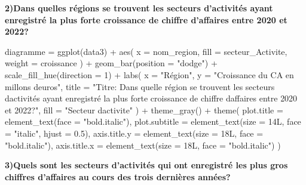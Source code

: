 \documentclass[mstat,12pt]{unswthesis}
\newenvironment{Shaded}{\begin{snugshade}}{\end{snugshade}}
\newcommand{\AttributeTok}[1]{\textcolor[rgb]{0.77,0.63,0.00}{#1}}
\newcommand{\DecValTok}[1]{\textcolor[rgb]{0.00,0.00,0.81}{#1}}
\newcommand{\FloatTok}[1]{\textcolor[rgb]{0.00,0.00,0.81}{#1}}
\newcommand{\FunctionTok}[1]{\textcolor[rgb]{0.00,0.00,0.00}{#1}}
\newcommand{\NormalTok}[1]{#1}
\newcommand{\OtherTok}[1]{\textcolor[rgb]{0.56,0.35,0.01}{#1}}
\newcommand{\SpecialCharTok}[1]{\textcolor[rgb]{0.00,0.00,0.00}{#1}}
\newcommand{\StringTok}[1]{\textcolor[rgb]{0.31,0.60,0.02}{#1}}
\begin{document}
\textbf{2)Dans quelles régions se trouvent les secteurs d'activités
ayant enregistré la plus forte croissance de chiffre d'affaires entre
2020 et 2022?}

\begin{Shaded}
\begin{Highlighting}[]
\NormalTok{   diagramme }\OtherTok{=} \FunctionTok{ggplot}\NormalTok{(data3) }\SpecialCharTok{+}
  \FunctionTok{aes}\NormalTok{(}
    \AttributeTok{x =}\NormalTok{ nom\_region,}
    \AttributeTok{fill =}\NormalTok{ secteur\_Activite,}
    \AttributeTok{weight =}\NormalTok{ croissance}
\NormalTok{  ) }\SpecialCharTok{+}
  \FunctionTok{geom\_bar}\NormalTok{(}\AttributeTok{position =} \StringTok{"dodge"}\NormalTok{) }\SpecialCharTok{+}
  \FunctionTok{scale\_fill\_hue}\NormalTok{(}\AttributeTok{direction =} \DecValTok{1}\NormalTok{) }\SpecialCharTok{+}
  \FunctionTok{labs}\NormalTok{(}
    \AttributeTok{x =} \StringTok{"Région"}\NormalTok{,}
    \AttributeTok{y =} \StringTok{"Croissance du CA en millons d\textquotesingle{}euros"}\NormalTok{,}
    \AttributeTok{title =} \StringTok{"Titre: Dans quelle région se trouvent les secteurs d\textquotesingle{}activités }
\StringTok{    ayant enregistré la plus forte croissance de chiffre d\textquotesingle{}affaires entre }
\StringTok{    2020 et 2022?"}\NormalTok{,}
    \AttributeTok{fill =} \StringTok{"Secteur d\textquotesingle{}activite"}
\NormalTok{  ) }\SpecialCharTok{+}
  \FunctionTok{theme\_gray}\NormalTok{() }\SpecialCharTok{+}
  \FunctionTok{theme}\NormalTok{(}
    \AttributeTok{plot.title =} \FunctionTok{element\_text}\NormalTok{(}\AttributeTok{face =} \StringTok{"bold.italic"}\NormalTok{),}
    \AttributeTok{plot.subtitle =} \FunctionTok{element\_text}\NormalTok{(}\AttributeTok{size =}\NormalTok{ 14L,}
    \AttributeTok{face =} \StringTok{"italic"}\NormalTok{,}
    \AttributeTok{hjust =} \FloatTok{0.5}\NormalTok{),}
    \AttributeTok{axis.title.y =} \FunctionTok{element\_text}\NormalTok{(}\AttributeTok{size =}\NormalTok{ 18L,}
    \AttributeTok{face =} \StringTok{"bold.italic"}\NormalTok{),}
    \AttributeTok{axis.title.x =} \FunctionTok{element\_text}\NormalTok{(}\AttributeTok{size =}\NormalTok{ 18L,}
    \AttributeTok{face =} \StringTok{"bold.italic"}\NormalTok{)}
\NormalTok{  ) }
\end{Highlighting}
\end{Shaded}

\medskip

\textbf{3)Quels sont les secteurs d'activités qui ont enregistré les
plus gros chiffres d'affaires au cours des trois dernières années?}
\end{document}
